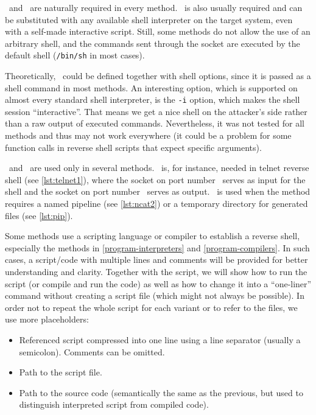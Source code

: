 \host\ and \port\ are naturally required in every method. \shell\ is also usually required and can be substituted with any available shell interpreter on the target system, even with a self-made interactive script. Still, some methods do not allow the use of an arbitrary shell, and the commands sent through the socket are executed by the default shell (\texttt{/bin/sh} in most cases).

Theoretically, \shell\ could be defined together with shell options, since it is passed as a shell command in most methods. An interesting option, which is supported on almost every standard shell interpreter, is the \texttt{-i} option, which makes the shell session ``interactive''. That means we get a nice shell on the attacker's side rather than a raw output of executed commands. Nevertheless, it was not tested for all methods and thus may not work everywhere (it could be a problem for some function calls in reverse shell scripts that expect specific arguments).

\portt\ and \tmp\ are used only in several methods. \portt\ is, for instance, needed in telnet reverse shell (see \cref{lst:telnet1}), where the socket on port number \port\ serves as input for the shell and the socket on port number \portt\ serves as output. \tmp\ is used when the method requires a named pipeline (see \cref{lst:ncat2}) or a temporary directory for generated files (see \cref{lst:pip}).

Some methods use a scripting language or compiler to establish a reverse shell, especially the methods in \cref{program-interpreters} and \cref{program-compilers}. In such cases, a script/code with multiple lines and comments will be provided for better understanding and clarity. Together with the script, we will show how to run the script (or compile and run the code) as well as how to change it into a ``one-liner'' command without creating a script file (which might not always be possible). In order not to repeat the whole script for each variant or to refer to the files, we use more placeholders:

\setlength{\leftmargini}{10em}
\begin{itemize}
\item[\script] Referenced script compressed into one line using a line separator (usually a semicolon). Comments can be omitted.
\item[\scriptfile] Path to the script file.
\item[\codefile] Path to the source code (semantically the same as the previous, but used to distinguish interpreted script from compiled code).
\end{itemize}
\setlength{\leftmargini}{2.5em}

